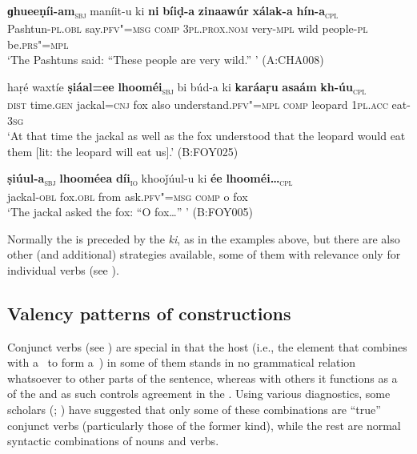 \ea
\label{ex:12-72}
\gll {\ob}\textbf{ɡhueeṇíi-am}{\cb}\textsubscript{\textsc{\upshape sbj}} maníit-u ki {\ob}\textbf{ni} \textbf{bíiḍ-a} \textbf{zinaawúr} \textbf{xálak-a} \textbf{hín-a}{\cb}\textsubscript{\textsc{\upshape cpl}}\\
Pashtun-\textsc{pl.obl} say.\textsc{pfv"=msg} \textsc{c}\textsc{om}\textsc{p} \textsc{3pl.prox.nom} very-\textsc{mpl} wild people-\textsc{pl} be.\textsc{prs"=mpl}\\
\glt `The Pashtuns said: ``These people are very wild.'' ' (A:CHA008)
\z

\ea
\label{ex:12-73}
\gll haṛé waxtíe {\ob}\textbf{ṣiáal=ee} \textbf{lhooméi}{\cb}\textsubscript{\textsc{\upshape sbj}} bi búd-a ki {\ob}\textbf{karáaṛu} \textbf{asaám} \textbf{kh-úu}{\cb}\textsubscript{\textsc{\upshape cpl}}\\
\textsc{dist} time.\textsc{gen} jackal=\textsc{cnj} fox also understand.\textsc{pfv"=mpl} \textsc{comp} leopard \textsc{1pl.acc} eat-\textsc{3sg}\\
\glt `At that time the jackal as well as the fox understood that the leopard would eat them [lit: the leopard will eat us].' (B:FOY025)
\z

\begin{exe}
\ex
\label{ex:12-74}
\gll {\ob}\textbf{ṣiúul-a}{\cb}\textsubscript{\textsc{\upshape sbj}} {\ob}\textbf{lhooméea} \textbf{díi}{\cb}\textsubscript{\textsc{io}} khooǰúul-u ki {\ob}\textbf{ée} \textbf{lhooméi{\ldots}}{\cb}\textsubscript{\textsc{\upshape cpl}} \\
jackal-\textsc{obl} fox.\textsc{obl} from ask.\textsc{pfv"=msg} \textsc{comp} o fox \\
\glt `The jackal asked the fox: ``O fox{\ldots}'' ' (B:FOY005)
\end{exe}

Normally the  is preceded by the  \textit{ki}, as in the examples above, but there are also other (and additional) strategies available, some of them with relevance only for individual  verbs (see ). 


\subsection{Valency patterns of  constructions}
\label{subsec:12-2-8}

Conjunct verbs (see ) are special in that the host (i.e., the element that combines with a~ to form a~) in some of them stands in no grammatical relation whatsoever to other parts of the sentence, whereas with others it functions as a~ of the  and as such controls agreement in the . Using various diagnostics, some scholars (\citealt[201]{verma1993}; \citealt[165]{mohanan1993}) have suggested that only some of these combinations are ``true'' conjunct verbs (particularly those of the former kind), while the rest are normal syntactic combinations of nouns and verbs. 



